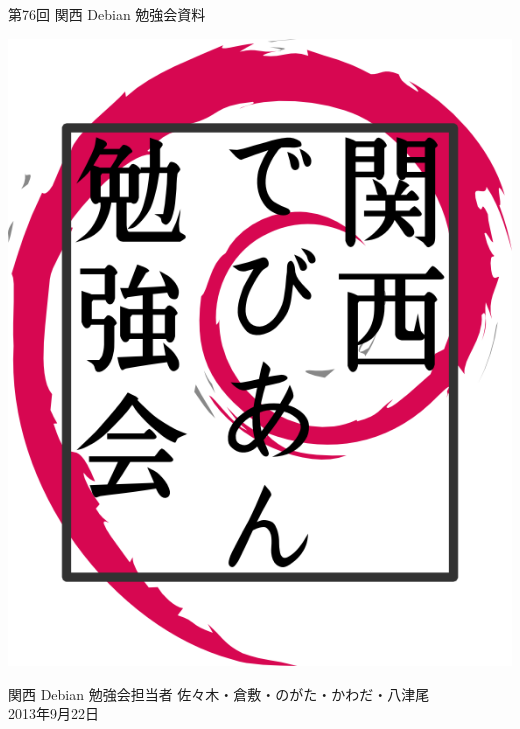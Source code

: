 \documentclass[mingoth,a4paper]{jsarticle}
\newcommand{\debmtgyear}{2013}
\newcommand{\debmtgdate}{22}
\newcommand{\debmtgmonth}{9}
\newcommand{\debmtgnumber}{76}
\begin{document}
\begin{titlepage}


 第\debmtgnumber{}回 関西 Debian 勉強会資料

\vspace{2cm}

\begin{center}
\includegraphics{image200802/kansaidebianlogo.png}
\end{center}

\begin{flushright}
\hfill{}関西 Debian 勉強会担当者 佐々木・倉敷・のがた・かわだ・八津尾 \\
\hfill{}\debmtgyear{}年\debmtgmonth{}月\debmtgdate{}日
\end{flushright}

\thispagestyle{empty}
\end{titlepage}


\vspace{1em}
\end{document}

